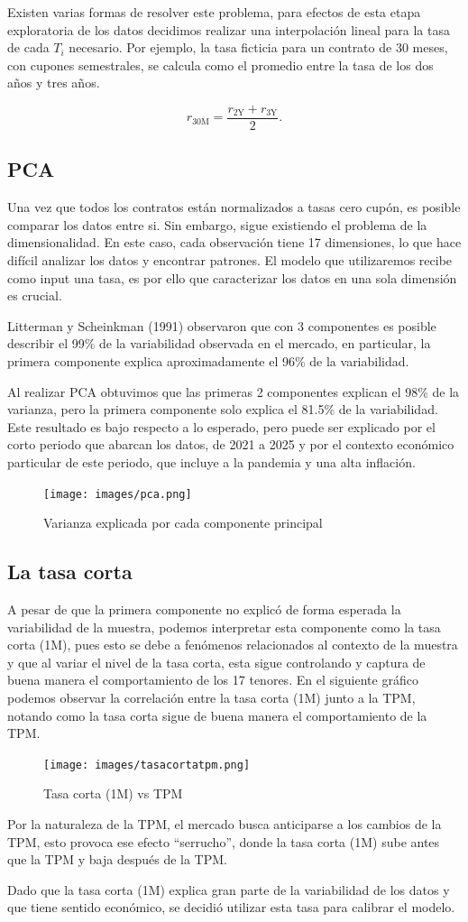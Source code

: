\qquad Existen varias formas de resolver este problema, para efectos de esta etapa exploratoria de los datos decidimos realizar una interpolación lineal para la tasa de cada $T_i$ necesario. Por ejemplo, la tasa ficticia para un contrato de 30 meses, con cupones semestrales, se calcula como el promedio entre la tasa de los dos años y tres años.

$$r_{30 \text{M}} = \dfrac{r_{2 \text{Y}} + r_{3 \text{Y}}}{2}.$$

\subsection{PCA}
\qquad Una vez que todos los contratos están normalizados a tasas cero cupón, es posible 
comparar los datos entre si. Sin embargo, sigue existiendo el problema de la 
dimensionalidad. En este caso, cada observación tiene 17 dimensiones, lo que hace difícil 
analizar los datos y encontrar patrones. El modelo que utilizaremos recibe como input una 
tasa, es por ello que caracterizar los datos en una sola dimensión es crucial. 

Litterman y Scheinkman (1991) observaron que con 3 componentes es posible describir el 99\% de la variabilidad observada en el mercado, en particular, la primera componente explica aproximadamente el 96\% de la variabilidad\cite{pca}.

Al realizar PCA obtuvimos que las primeras 2 componentes explican el 98\% de la varianza, pero la primera componente solo explica el 81.5\% de la variabilidad. Este resultado es bajo respecto a lo esperado, pero puede ser explicado por el corto periodo que abarcan los datos, de 2021 a 2025 y por el contexto económico particular de este periodo, que incluye a la pandemia y una alta inflación. 
\begin{figure}[H]
    \centering
        \texttt{[image: images/pca.png]}
    \caption{Varianza explicada por cada componente principal
    }\label{fig:varpca}
\end{figure}
\subsection{La tasa corta}
\qquad A pesar de que la primera componente no explicó de forma esperada la variabilidad de la muestra, podemos interpretar esta componente como la tasa corta (1M), pues esto se debe a fenómenos relacionados al contexto de la muestra y que al variar el nivel de la tasa corta, esta sigue controlando y captura de buena manera el comportamiento de los 17 tenores. En el siguiente gráfico podemos observar la correlación entre la tasa corta (1M) junto a la TPM, notando como la tasa corta sigue de buena manera el comportamiento de la TPM.
\begin{figure}[H]
    \centering
        \texttt{[image: images/tasacortatpm.png]}
    \caption{Tasa corta (1M) vs TPM
    }\label{fig:varpca}
\end{figure}
Por la naturaleza de la TPM, el mercado busca anticiparse a los cambios de la TPM, esto provoca ese efecto “serrucho”, donde la tasa corta (1M) sube antes que la TPM y baja después de la TPM. 

Dado que la tasa corta (1M) explica gran parte de la variabilidad 
de los datos y que tiene sentido económico, se decidió utilizar 
esta tasa para calibrar el modelo.
